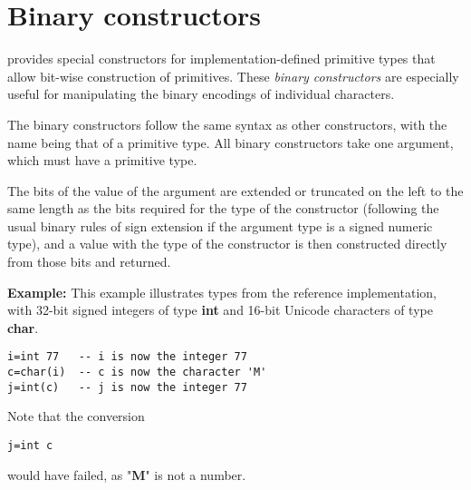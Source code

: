 \section{Binary constructors}\label{refbincon}
 
\nr{} provides special constructors for implementation-defined
primitive types that allow bit-wise construction of primitives.
These \emph{binary constructors} are especially useful for
manipulating the binary encodings of individual characters.
 
The binary constructors follow the same syntax as other constructors,
with the name being that of a primitive type.  All binary constructors
take one argument, which must have a primitive type.
 
The bits of the value of the argument are extended or truncated on the
left to the same length as the bits required for the type of the
constructor (following the usual binary rules of sign extension if the
argument type is a signed numeric type), and a value with the type of
the constructor is then constructed directly from those bits and
returned.

\textbf{Example:}
 This example illustrates types from the reference implementation,
with 32-bit signed integers of type \textbf{int} and 16-bit Unicode
characters of type \textbf{char}.
\begin{lstlisting}
i=int 77   -- i is now the integer 77
c=char(i)  -- c is now the character 'M'
j=int(c)   -- j is now the integer 77
\end{lstlisting}
Note that the conversion
\begin{lstlisting}
j=int c
\end{lstlisting}
would have failed, as "\textbf{M}" is not a number.
